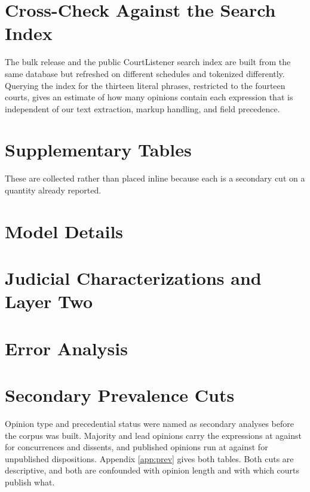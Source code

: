 \section{Cross-Check Against the Search Index}
\label{app:api}

The bulk release and the public CourtListener search index are built from the
same database but refreshed on different schedules and tokenized differently.
Querying the index for the thirteen literal phrases, restricted to the fourteen
courts, gives an estimate of how many opinions contain each expression that is
independent of our text extraction, markup handling, and field precedence.



\section{Supplementary Tables}
\label{app:supp}




These are collected rather than placed inline because each is a secondary cut on
a quantity already reported.

\section{Model Details}
\label{app:models}



\section{Judicial Characterizations and Layer Two}
\label{app:layer2}
\label{app:judicial}



\section{Error Analysis}
\label{app:errors}



\section{Secondary Prevalence Cuts}

Opinion type and precedential status were named as secondary analyses before the
corpus was built. Majority and lead opinions carry the expressions at \PrevMajority{}
against \PrevSeparate{} for concurrences and dissents, and published opinions run at
\PrevPub{} against \PrevUnpub{} for unpublished dispositions. Appendix \ref{app:prev}
gives both tables. Both cuts are descriptive, and both are confounded with opinion
length and with which courts publish what.

